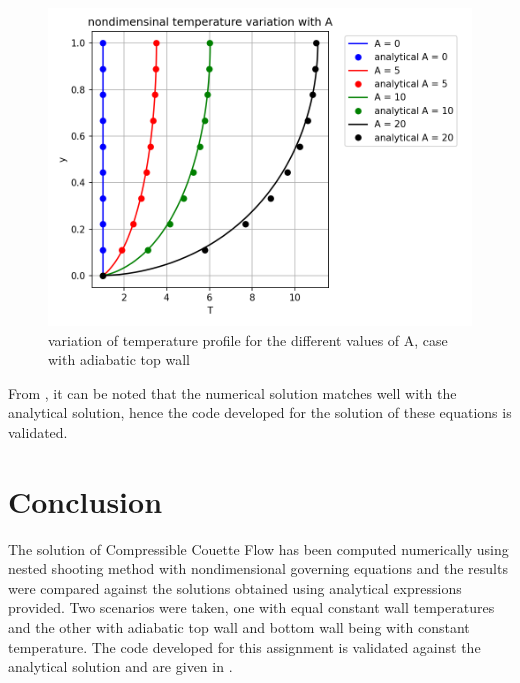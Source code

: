 \begin{figure}[!h]
   \centering
    \includegraphics[scale=0.6]{supporting_documents/02_adiabaticWall/T_profiles.png}
    \caption{variation of temperature profile for the different values of A, case with adiabatic top wall}
    \label{sol_aw_t}
\end{figure}

From , it can be noted that the
numerical solution matches well with the analytical solution, hence the
code developed for the solution of these equations is validated.

\pagebreak

\section{Conclusion}
The solution of Compressible Couette Flow has been computed numerically using
nested shooting method with nondimensional governing equations and the results
were compared against the solutions obtained using analytical expressions provided.
Two scenarios were taken, one with equal constant wall temperatures and
the other with adiabatic top wall and bottom wall being with constant
temperature. The code developed for this assignment is validated against the
analytical solution and are given in .
